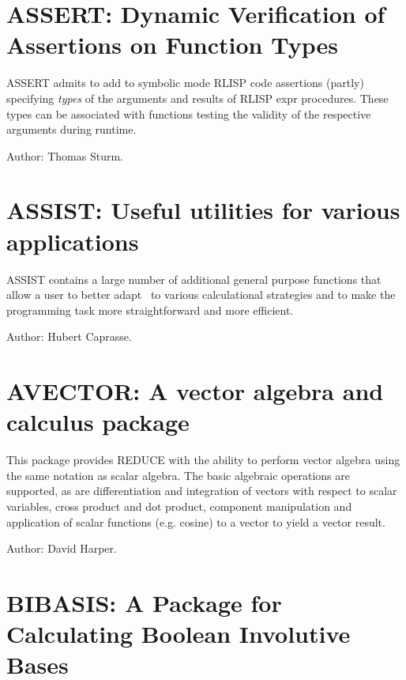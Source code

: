 \section{ASSERT: Dynamic Verification of Assertions on Function Types}
\label{ASSERT}

ASSERT admits to add to symbolic mode RLISP code assertions (partly)          
specifying \emph{types} of the arguments and results of RLISP expr
procedures. These types can be associated with functions testing the
validity of the respective arguments during runtime.

Author: Thomas Sturm.


\newpage

\section{ASSIST: Useful utilities for various applications} 
\label{ASSIST}\hypertarget{ASSIST}{}

ASSIST contains a large number of additional general purpose functions
that allow a user to better adapt \REDUCE\ to various calculational
strategies and to make the programming task more straightforward and more
efficient.

Author: Hubert Caprasse.


\newpage

\section{AVECTOR: A vector algebra and calculus package} 

This package provides REDUCE with the ability to perform vector algebra
using the same notation as scalar algebra.  The basic algebraic operations
are supported, as are differentiation and integration of vectors with
respect to scalar variables, cross product and dot product, component
manipulation and application of scalar functions (e.g. cosine) to a vector
to yield a vector result.

Author: David Harper.


\newpage

\section{BIBASIS: A Package for Calculating Boolean Involutive Bases}
 \label{BIBASIS}

